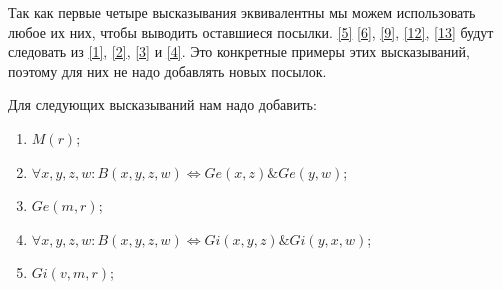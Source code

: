 \documentclass[a4paper,14pt]{article} %
\begin{document}
Так как первые четыре высказывания эквивалентны мы можем использовать любое их них, 
чтобы выводить оставшиеся посылки. \ref{5} \ref{6}, \ref{9}, \ref{12}, \ref{13} будут 
следовать из \ref{1}, \ref{2}, \ref{3} и \ref{4}. 
Это конкретные примеры этих высказываний, поэтому для них не надо добавлять новых посылок.

Для следующих высказываний нам надо добавить:
\begin{enumerate}
    \item $M(r)$;
    \item $\forall x,y,z,w: B(x, y, z, w) \Leftrightarrow Ge(x, z) \& Ge(y, w)$;
    \item $Ge(m, r)$;
    \item $\forall x,y,z,w: B(x, y, z, w) \Leftrightarrow Gi(x, y, z) \& Gi(y, x, w)$; 
    \item $Gi(v, m, r)$;
\end{enumerate}
\end{document}
